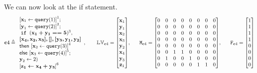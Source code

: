 %
We can now look at the if statement.
\[ 
%
\ssa{c}4 \triangleq
\begin{array}{l}
	\left[ \ssa{x}_1 \leftarrow \query(1) \right]^1; 
	\\
	\left[\ssa{y}_1 \leftarrow \query(2) \right]^2 ; 
	\\
\eif \;( \ssa{ x_1 + y_1 == 5} )^3,  \\
\ssa{[ x_4,x_2,x_3 ],[] ,[y_3,y_1,y_2 ]} 
\\
\mathsf{then} ~ \left[ 
\ssa{x}_2 \leftarrow \query(3) \right]^4 
\\
\mathsf{else} ~ \left[ 
\ssa{x}_3 \leftarrow \query(4) \right]^5 ; 
\\
\ssa{y}_2 \leftarrow 2 ) \\
\left[ \ssa{ z_1 \leftarrow x_4 +y_3 }\right]^6
\end{array},
~~~~~~
\lvar_{\ssa{c}4} =  \left[ \begin{matrix}
\ssa{x}_1 \\
\ssa{y}_1 \\
\ssa{x}_2 \\
\ssa{x}_3 \\
\ssa{y}_2 \\
\ssa{x}_4 \\
\ssa{y}_3 \\
\ssa{z}_1 \\
\end{matrix} \right], 
~~~~~ 
\Mtrix_{\ssa{c}4} =  \left[ \begin{matrix}
0 & 0 & 0 & 0 & 0 & 0 & 0 & 0 \\
0 & 0 & 0 & 0 & 0 & 0 & 0 & 0 \\
0 & 0 & 0 & 0 & 0 & 0 & 0 & 0 \\
0 & 0 & 0 & 0 & 0 & 0 & 0 & 0 \\
0 & 0 & 0 & 0 & 0 & 0 & 0 & 0 \\
0 & 0 & 1 & 1 & 0 & 0 & 0 & 0 \\
0 & 1 & 0 & 0 & 1 & 0 & 0 & 0 \\
0 & 0 & 0 & 0 & 0 & 1 & 1 & 0 \\
\end{matrix} \right], 
~~~~~ 
\flag_{\ssa{c}4} = \left [ \begin{matrix}
1 \\
1 \\
1 \\
1 \\
0 \\
0 \\
0 \\
0 \\
\end{matrix} \right ]
\]
%
%
%
%
